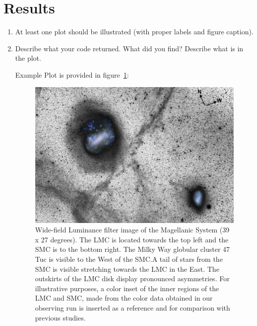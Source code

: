 \documentclass[iop]{emulateapj}
\begin{document}
	
\section{Results}

\begin{enumerate}
	\item At least one plot should be illustrated (with proper labels and figure caption).  
    
    \item Describe what your code returned. What did you find? Describe what is  in the plot.
    
    Example Plot is provided in figure~\ref{fig:Panorama}:  
    
\begin{figure}
\begin{center}
\mbox{\includegraphics[width=7in]{./Fig1.eps}}
\end{center}
\caption{\label{fig:Panorama} Wide-field Luminance filter image of the 
Magellanic System (39 x 27 degrees). The LMC is located towards the top left 
and the SMC is to the bottom right. The Milky Way globular cluster 47 Tuc is visible to the West of the SMC.A tail of stars from the SMC is visible stretching towards the LMC in the East.  The outskirts of the LMC disk display pronounced asymmetries.  For illustrative purposes, a color inset of the inner regions of the LMC and SMC, made from the color data obtained in our observing run is inserted as a reference and for comparison with previous studies. }
\end{figure}
    
    
    
\end{enumerate}
\end{document}

